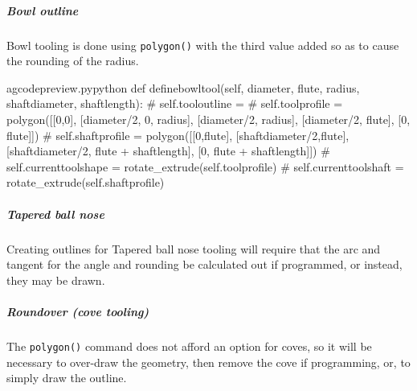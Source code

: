 \documentclass{ltxdoc}
\begin{document}
\subparagraph{Bowl outline}

Bowl tooling is done using \verb|polygon()| with the third value added so as to cause the rounding of the radius.

\lstset{firstnumber=\thegcpy}
\begin{writecode}{a}{gcodepreview.py}{python}
    def definebowltool(self, diameter, flute, radius, shaftdiameter, shaftlength):
#        self.tooloutline = 
#
        self.toolprofile = polygon([[0,0], [diameter/2, 0, radius], [diameter/2, radius], [diameter/2, flute], [0, flute]])
#
        self.shaftprofile = polygon([[0,flute], [shaftdiameter/2,flute], [shaftdiameter/2, flute + shaftlength], [0, flute + shaftlength]])
#
        self.currenttoolshape = rotate_extrude(self.toolprofile)
#
        self.currenttoolshaft = rotate_extrude(self.shaftprofile) 

\end{writecode}
\addtocounter{gcpy}{11}

\subparagraph{Tapered ball nose}

Creating outlines for Tapered ball nose tooling will require that the arc and tangent for the angle and rounding be calculated out if programmed, or instead, they may be drawn.

%
%
%
%

\subparagraph{Roundover (cove tooling)}

The \verb|polygon()| command does not afford an option for coves, so it will be necessary to over-draw the geometry, then remove the cove if programming, or, to simply draw the outline.
\end{document}
